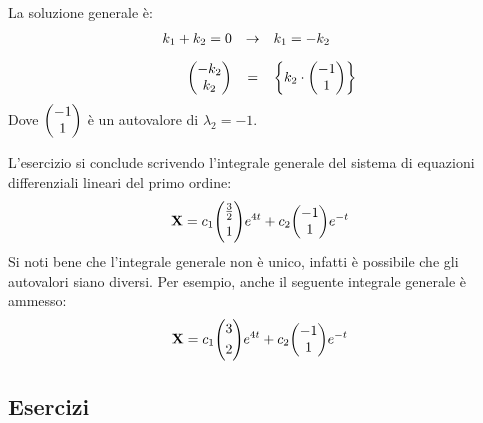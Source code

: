 \documentclass[a4paper]{article}
\makeatletter
\newenvironment{rowequmat}[1]{\left(\array{@{}#1@{}}}{\endarray\right)}
\makeatother
\begin{document}
	La soluzione generale è:
	\begin{equation*}
		\begin{array}{rcl}
			k_{1} + k_{2} = 0 &\rightarrow& k_{1} = -k_{2} \\ [1em]
			\begin{rowequmat}{ c }
				-k_{2} \\ k_{2}
			\end{rowequmat}
			&=&
			\left\{
				k_{2} \cdot 
				\begin{rowequmat}{ c }
					-1 \\ 1
				\end{rowequmat}
			\right\}
		\end{array}
	\end{equation*}
	Dove $\begin{rowequmat}{ c }
		-1 \\ 1
	\end{rowequmat}$ è un autovalore di $\lambda_{2} = -1$.\newline

	\noindent
	L'esercizio si conclude scrivendo l'integrale generale del sistema di equazioni differenziali lineari del primo ordine:
	\begin{equation*}
		\mathbf{X} = c_{1} \begin{rowequmat}{c}
			\frac{3}{2} \\ [.3em]
			1
		\end{rowequmat}
		e^{4t} + 
		c_{2} \begin{rowequmat}{ c }
			-1 \\ 1
		\end{rowequmat}
		e^{-t}
	\end{equation*}
	Si noti bene che l'integrale generale non è unico, infatti è possibile che gli autovalori siano diversi. Per esempio, anche il seguente integrale generale è ammesso:
	\begin{equation*}
		\mathbf{X} = c_{1} \begin{rowequmat}{c}
			3 \\ [.3em]
			2
		\end{rowequmat}
		e^{4t} + 
		c_{2} \begin{rowequmat}{ c }
			-1 \\ 1
		\end{rowequmat}
		e^{-t}
	\end{equation*}\newpage

	\subsection{Esercizi}\label{subsection: esercizi equazioni differenziali}
\end{document}
